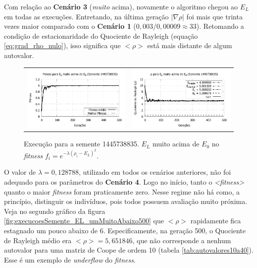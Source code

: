 	Com relação ao \textbf{Cenário 3} (\emph{muito} acima), novamente o algoritmo chegou ao $E_L$ em todas as execuções. Entretando, na última geração $|\nabla\rho|$ foi mais que trinta vezes maior comparado com o \textbf{Cenário 1} ($0,003 / 0,00009 \approx 33$). Retomando a condição de estacionaridade do Quociente de Rayleigh (equação \ref{eq:grad_rho_nulo}), isso significa que $<\rho>$ está mais distante de algum autovalor.

	\begin{figure}[htbp]
	\centering
  \begin{tabular}{@{}cc@{}}	
		\includegraphics[width=.45\textwidth]{figs/resultados/variandoELSemente/T3_S-1445738835_fitness.pdf} &
    \includegraphics[width=.45\textwidth]{figs/resultados/variandoELSemente/T3_S-1445738835_rho.pdf}
  \end{tabular}
  \caption{Execução para a semente 1445738835. $E_L$ muito acima de $E_0$ no \textit{fitness} $f_i = e^{-\lambda(\rho_i - E_L)^2}$.}
	\label{fig:execucoesSemente_EL_umMuitoAcima}
	\end{figure}
		
	O valor de $\lambda = 0,128788$, utilizado em todos os cenários anteriores, não foi adequado para os parâmetros do \textbf{Cenário 4}. Logo no início, tanto o \emph{<fitness>} quanto o maior \emph{fitness} foram praticamente zero.  Nesse regime não há como, a princípio, distinguir os indivíduos, pois todos possuem avaliação muito próxima. Veja no segundo gráfico da figura \ref{fig:execucoesSemente_EL_umMuitoAbaixo500} que $<\rho>$ rapidamente fica estagnado um pouco abaixo de 6. Especificamente, na geração 500, o Quociente de Rayleigh médio era $<\rho> = 5,651846$, que não corresponde a nenhum autovalor para uma matriz de Coope de ordem 10 (tabela \ref{tab:autovalores10a40}). Esse é um exemplo de \emph{underflow} do \emph{fitness}.
	
